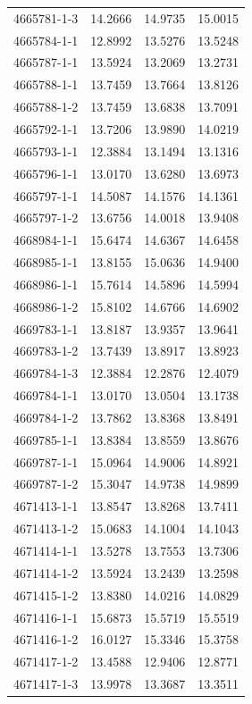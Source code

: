 \begin{longtable}{lrrr}
4665781-1-3 & 14.2666 & 14.9735 & 15.0015 \\
4665784-1-1 & 12.8992 & 13.5276 & 13.5248 \\
4665787-1-1 & 13.5924 & 13.2069 & 13.2731 \\
4665788-1-1 & 13.7459 & 13.7664 & 13.8126 \\
4665788-1-2 & 13.7459 & 13.6838 & 13.7091 \\
4665792-1-1 & 13.7206 & 13.9890 & 14.0219 \\
4665793-1-1 & 12.3884 & 13.1494 & 13.1316 \\
4665796-1-1 & 13.0170 & 13.6280 & 13.6973 \\
4665797-1-1 & 14.5087 & 14.1576 & 14.1361 \\
4665797-1-2 & 13.6756 & 14.0018 & 13.9408 \\
4668984-1-1 & 15.6474 & 14.6367 & 14.6458 \\
4668985-1-1 & 13.8155 & 15.0636 & 14.9400 \\
4668986-1-1 & 15.7614 & 14.5896 & 14.5994 \\
4668986-1-2 & 15.8102 & 14.6766 & 14.6902 \\
4669783-1-1 & 13.8187 & 13.9357 & 13.9641 \\
4669783-1-2 & 13.7439 & 13.8917 & 13.8923 \\
4669784-1-3 & 12.3884 & 12.2876 & 12.4079 \\
4669784-1-1 & 13.0170 & 13.0504 & 13.1738 \\
4669784-1-2 & 13.7862 & 13.8368 & 13.8491 \\
4669785-1-1 & 13.8384 & 13.8559 & 13.8676 \\
4669787-1-1 & 15.0964 & 14.9006 & 14.8921 \\
4669787-1-2 & 15.3047 & 14.9738 & 14.9899 \\
4671413-1-1 & 13.8547 & 13.8268 & 13.7411 \\
4671413-1-2 & 15.0683 & 14.1004 & 14.1043 \\
4671414-1-1 & 13.5278 & 13.7553 & 13.7306 \\
4671414-1-2 & 13.5924 & 13.2439 & 13.2598 \\
4671415-1-2 & 13.8380 & 14.0216 & 14.0829 \\
4671416-1-1 & 15.6873 & 15.5719 & 15.5519 \\
4671416-1-2 & 16.0127 & 15.3346 & 15.3758 \\
4671417-1-2 & 13.4588 & 12.9406 & 12.8771 \\
4671417-1-3 & 13.9978 & 13.3687 & 13.3511 \\

\end{longtable}

